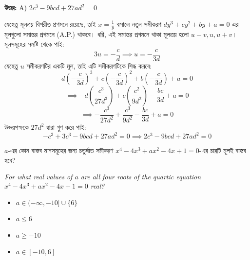 \documentclass[12pt, a4paper]{article}
\begin{document}
\vspace{0.5em}
\begin{tcolorbox}[answerbox]
    \textbf{\color{success} উত্তর:} A) $2c^3 - 9bcd + 27ad^2 = 0$
\end{tcolorbox}
\vspace{1em}

\begin{tcolorbox}[solutionbox={সমাধান (Solution)}]
    \noindent
    যেহেতু মূলত্রয় বিপরীত প্রগমনে রয়েছে, তাই $x = \frac{1}{y}$ বসালে নতুন সমীকরণ $dy^3 + cy^2 + by + a = 0$ এর মূলগুলো সমান্তর প্রগমনে (A.P.) থাকবে। 
    ধরি, এই সমান্তর প্রগমনে থাকা মূলত্রয় হলো $u-v, u, u+v$। 
    মূলসমূহের সমষ্টি থেকে পাই:
    \[ 3u = -\frac{c}{d} \implies u = -\frac{c}{3d} \]
    যেহেতু $u$ সমীকরণটির একটি মূল, তাই এটি সমীকরণটিকে সিদ্ধ করবে:
    \[ d\left(-\frac{c}{3d}\right)^3 + c\left(-\frac{c}{3d}\right)^2 + b\left(-\frac{c}{3d}\right) + a = 0 \]
    \[ \implies -d\left(\frac{c^3}{27d^3}\right) + c\left(\frac{c^2}{9d^2}\right) - \frac{bc}{3d} + a = 0 \]
    \[ \implies -\frac{c^3}{27d^2} + \frac{c^3}{9d^2} - \frac{bc}{3d} + a = 0 \]
    উভয়পক্ষকে $27d^2$ দ্বারা গুণ করে পাই:
    \[ -c^3 + 3c^3 - 9bcd + 27ad^2 = 0 \implies 2c^3 - 9bcd + 27ad^2 = 0 \]
\end{tcolorbox}

\vspace{1.5em}

\begin{tcolorbox}[questionbox={প্রশ্ন (Question) 46}]
    \noindent
    $a$-এর কোন বাস্তব মানসমূহের জন্য চতুর্ঘাত সমীকরণ $x^4 - 4x^3 + ax^2 - 4x + 1 = 0$-এর চারটি মূলই বাস্তব হবে?
    
    \vspace{0.8em}
    \begin{english}
    \noindent\textit{\color{darkgray}
    For what real values of $a$ are all four roots of the quartic equation $x^4 - 4x^3 + ax^2 - 4x + 1 = 0$ real?
    }
    \end{english}
\end{tcolorbox}

\begin{itemize}[label={}, leftmargin=1cm, itemsep=0.5em]
    \item[\textbf{A)}] $a \in (-\infty, -10] \cup \{6\}$
    \item[\textbf{B)}] $a \le 6$
    \item[\textbf{C)}] $a \ge -10$
    \item[\textbf{D)}] $a \in [-10, 6]$
\end{itemize}
\end{document}

